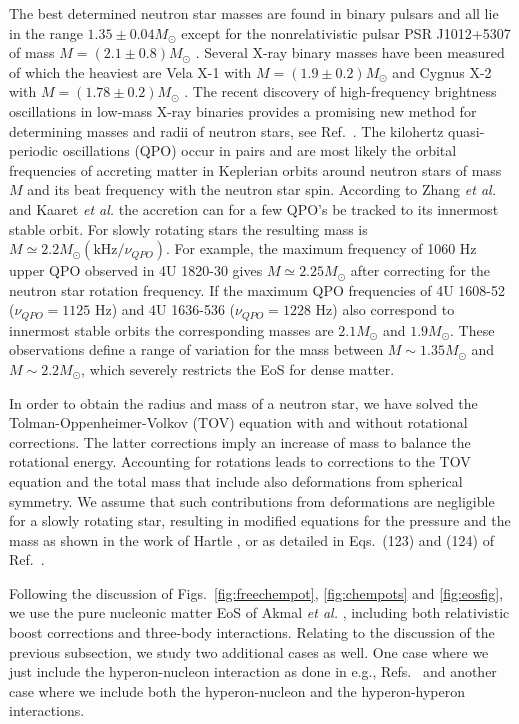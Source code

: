 The best determined neutron star masses are found in binary pulsars
and all lie in the range $1.35\pm 0.04 M_\odot$ \cite{tc99}
except for the nonrelativistic pulsar PSR J1012+5307
of mass
$M=(2.1\pm 0.8)M_\odot$ \cite{vanParadijs1998}. Several X-ray binary
masses have been measured of which the heaviest are
Vela X-1 with $M=(1.9\pm 0.2)M_\odot$ \cite{Barziv1999}
and Cygnus X-2 with
$M=(1.78\pm 0.2)M_\odot$ \cite{OroszKuulkers1999}.  The recent
discovery of high-frequency brightness oscillations in low-mass X-ray
binaries provides a promising new method for determining masses and
radii of neutron stars, see Ref.\ \cite{miller99}. The
kilohertz quasi-periodic oscillations (QPO) occur in pairs
and are most likely the orbital
frequencies of accreting matter
in Keplerian orbits around neutron stars of mass $M$ and its beat
frequency with the neutron star spin.  According to
Zhang {\em et al.} \cite{zhang98} and   Kaaret {\em et al.}
\cite{kaaret1998} the accretion
can for a few QPO's be tracked to its innermost stable orbit.
For slowly rotating stars the resulting mass is
$M\simeq2.2M_\odot({\mathrm{kHz}}/\nu_{QPO})$.  For example, the
maximum frequency of 1060 Hz upper QPO observed in 4U 1820-30 gives 
$M\simeq 2.25M_\odot$ after correcting for the neutron star
rotation frequency.  If the maximum QPO frequencies of 4U 1608-52
($\nu_{QPO}=1125$ Hz) and 4U 1636-536 ($\nu_{QPO}=1228$ Hz) also
correspond to innermost stable orbits the corresponding masses are
$2.1M_\odot$ and $1.9M_\odot$. 
These observations define a range of variation for the mass between
$M\sim 1.35 M_\odot$ and $M\sim 2.2 M_\odot$, which severely restricts the
EoS for dense matter. 

In order to obtain the radius and mass of a neutron star, we have solved
the Tolman-Oppenheimer-Volkov (TOV) equation with and without
rotational corrections. The latter corrections imply an increase of mass
to balance the rotational energy. Accounting for rotations leads
to corrections to the TOV equation and the total mass that include
also deformations from spherical symmetry. We assume that such 
contributions from deformations are negligible for a slowly
rotating star, resulting in modified  equations for the pressure
and the mass as shown in the work of 
Hartle \cite{hartle1967}, or as detailed in Eqs.~(123) and (124) of 
Ref.\ \cite{hh99}. 

Following the discussion of Figs.~\ref{fig:freechempot}, 
\ref{fig:chempots} and \ref{fig:eosfig}, we use the 
pure nucleonic matter EoS of Akmal {\em et al.} \cite{apr98},
including both relativistic boost corrections and
three-body interactions. 
Relating to the discussion of the previous subsection, we study
two additional cases as well. One case 
where we just include the hyperon-nucleon
interaction as done in e.g., Refs.~\cite{bbs00} and another case
where we include both the hyperon-nucleon and the hyperon-hyperon
interactions.

